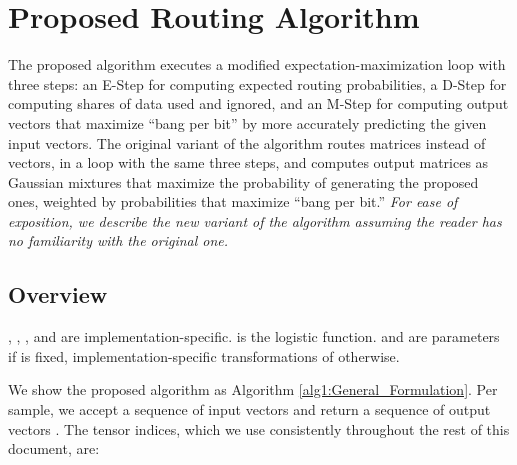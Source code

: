 \documentclass[11pt,a4paper]{article}
\begin{document}
\section{Proposed Routing Algorithm}\label{sec:proposed_algorithm}

The proposed algorithm executes a modified expectation-maximization loop with three steps: an E-Step for computing expected routing probabilities, a D-Step for computing shares of data used and ignored, and an M-Step for computing output vectors that maximize ``bang per bit'' by more accurately predicting the given input vectors. The original variant of the algorithm \cite{DBLP:journals/corr/abs-1911-00792} routes matrices instead of vectors, in a loop with the same three steps, and computes output matrices as Gaussian mixtures that maximize the probability of generating the proposed ones, weighted by probabilities that maximize ``bang per bit.'' {\em For ease of exposition, we describe the new variant of the algorithm assuming the reader has no familiarity with the original one.}


\subsection{Overview}

\begin{algorithm*}[t]
	\small
	\DontPrintSemicolon
	\caption{, , , and  are implementation-specific.  is the logistic function.  and  are parameters if  is fixed, implementation-specific transformations of  otherwise.}
	\label{alg1:General_Formulation}
	\KwOut{}
	\BlankLine
	  \label{alg1:a_inp_i}
	  \label{alg1:V_ijh}
\end{algorithm*}

We show the proposed algorithm as Algorithm \ref{alg1:General_Formulation}. Per sample, we accept a sequence of input vectors  and return a sequence of output vectors . The tensor indices, which we use consistently throughout the rest of this document, are:
\end{document}

